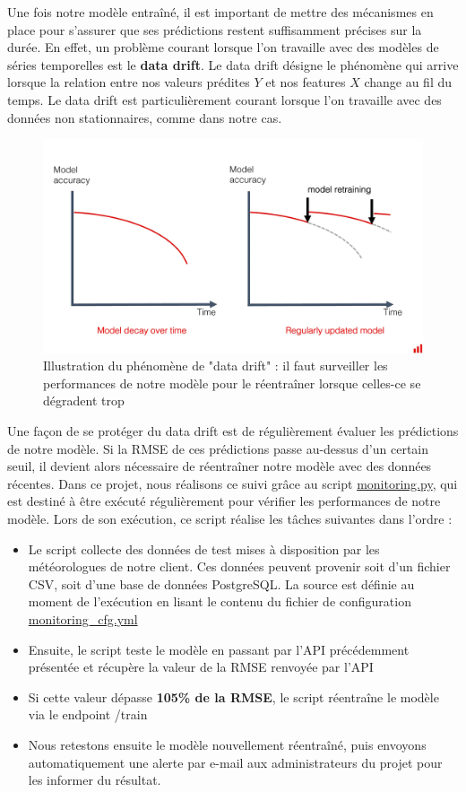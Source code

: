 \documentclass[french]{article}
\begin{document}
    Une fois notre modèle entraîné, il est important de mettre des mécanismes en place pour s'assurer que ses prédictions restent suffisamment précises sur la durée. En effet, un problème courant lorsque l'on travaille avec des modèles de séries temporelles est le \textbf{data drift}. Le data drift désigne le phénomène qui arrive lorsque la relation entre nos valeurs prédites $Y$ et nos features $X$ change au fil du temps. Le data drift est particulièrement courant lorsque l'on travaille avec des données non stationnaires, comme dans notre cas.
    \begin{figure}[h]
        \includegraphics[width=12cm]{data_drift}
        \centering
        \caption{Illustration du phénomène de "data drift" : il faut surveiller les performances de notre modèle pour le réentraîner lorsque celles-ce se dégradent trop}
        \centering
    \end{figure}
    Une façon de se protéger du data drift est de régulièrement évaluer les prédictions de notre modèle. Si la RMSE de ces prédictions passe au-dessus d'un certain seuil, il devient alors nécessaire de réentraîner notre modèle avec des données récentes. Dans ce projet, nous réalisons ce suivi grâce au script \href{https://github.com/vinpap/predict_climate_change/blob/main/monitoring.py}{monitoring.py}, qui est destiné à être exécuté régulièrement pour vérifier les performances de notre modèle. Lors de son exécution, ce script réalise les tâches suivantes dans l'ordre :
    \begin{itemize}
        \item Le script collecte des données de test mises à disposition par les météorologues de notre client. Ces données peuvent provenir soit d'un fichier CSV, soit d'une base de données PostgreSQL. La source est définie au moment de l'exécution en lisant le contenu du fichier de configuration \href{https://github.com/vinpap/predict_climate_change/blob/main/monitoring_cfg.yml}{monitoring\_cfg.yml}
        \item Ensuite, le script teste le modèle en passant par l'API précédemment présentée et récupère la valeur de la RMSE renvoyée par l'API
        \item Si cette valeur dépasse \textbf{105\% de la RMSE}, le script réentraîne le modèle via le endpoint /train
        \item Nous retestons ensuite le modèle nouvellement réentraîné, puis envoyons automatiquement une alerte par e-mail aux administrateurs du projet pour les informer du résultat.
    \end{itemize}
\end{document}
